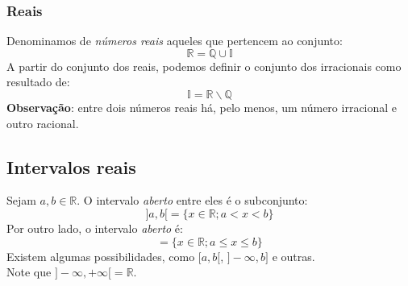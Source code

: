\documentclass[13pt,letterpaper]{article}
\begin{document}
\subsubsection{Reais}
Denominamos de \emph{números reais} aqueles que pertencem ao conjunto:
\begin{displaymath}
    \mathbb{R} = \mathbb{Q} \cup \mathbb{I}
\end{displaymath}
A partir do conjunto dos reais, podemos definir o conjunto dos irracionais como resultado de:
\begin{displaymath}
    \mathbb{I} = \mathbb{R} \backslash \mathbb{Q}
\end{displaymath}
\textbf{Observação}: entre dois números reais há, pelo menos, um número irracional e outro racional.

\subsection{Intervalos reais}
Sejam $a, b \in \mathbb{R}$. O intervalo \emph{aberto} entre eles é o subconjunto:
\begin{displaymath}
    ]a, b[ = \{ x \in \mathbb{R}; a < x < b\}
\end{displaymath}
Por outro lado, o intervalo \emph{aberto} é:
\begin{displaymath}
    [a, b] = \{ x \in \mathbb{R}; a \leq x \leq b\}
\end{displaymath}
Existem algumas possibilidades, como $[a, b[$, $] - \infty, b] $ e outras. \\ Note que $ ]-\infty, +\infty [ = \mathbb{R}$.
\end{document}
